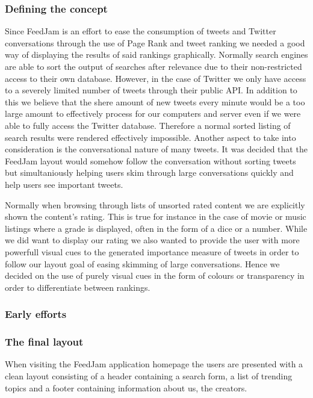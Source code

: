 \subsubsection{Defining the concept}
Since FeedJam is an effort to ease the consumption of tweets and Twitter conversations through the use of Page Rank and tweet ranking we needed a good way of displaying the results of said rankings graphically. Normally search engines are able to sort the output of searches after relevance due to their non-restricted access to their own database. However, in the case of Twitter we only have access to a severely limited number of tweets through their public API. In addition to this we believe that the shere amount of new tweets every minute would be a too large amount to effectively process for our computers and server even if we were able to fully access the Twitter database. Therefore a normal sorted listing of search results were rendered effectively impossible. Another aspect to take into consideration is the conversational nature of many tweets. It was decided that the FeedJam layout would somehow follow the conversation without sorting tweets but simultaniously helping users skim through large conversations quickly and help users see important tweets.

Normally when browsing through lists of unsorted rated content we are explicitly shown the content's rating. This is true for instance in the case of movie or music listings where a grade is displayed, often in the form of a dice or a number. While we did want to display our rating we also wanted to provide the user with more powerfull visual cues to the generated importance measure of tweets in order to follow our layout goal of easing skimming of large conversations. Hence we decided on the use of purely visual cues in the form of colours or transparency in order to differentiate between rankings.

\subsubsection{Early efforts}


\subsubsection{The final layout}
When visiting the FeedJam application homepage the users are presented with a clean layout consisting of a header containing a search form, a list of trending topics and a footer containing information about us, the creators. 

